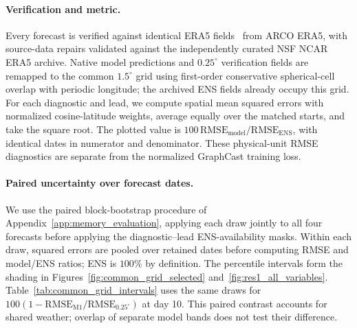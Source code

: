 \documentclass{article}
\newcommand{\vfourchange}[1]{{\color{blue}#1}}
\newif\ifvfivechanges
\begin{document}
\paragraph{\vfourchange{Verification and metric.}}
\vfourchange{Every forecast is verified against identical ERA5 fields~\citep{hersbach2020era5} from ARCO ERA5, with source-data repairs validated against the independently curated NSF NCAR ERA5 archive. Native model predictions and $0.25^\circ$ verification fields are remapped to the common $1.5^\circ$ grid using first-order conservative spherical-cell overlap with periodic longitude; the archived ENS fields already occupy this grid. For each diagnostic and lead, we compute spatial mean squared errors with normalized cosine-latitude weights, average equally over the matched starts, and take the square root. The plotted value is $100\,\mathrm{RMSE}_{\mathrm{model}}/\mathrm{RMSE}_{\mathrm{ENS}}$, with identical dates in numerator and denominator. These physical-unit RMSE diagnostics are separate from the normalized GraphCast training loss.}

\paragraph{\vfourchange{Paired uncertainty over forecast dates.}}
\ifvfivechanges
\par\begingroup\color{vfiveDeleted}\noindent
\sout{We use 10,000 non-wrapping moving-block-bootstrap draws with seed 20260916 and blocks of five consecutive positions on the original regular 122-date grid (12 elapsed days). A draw concatenates sampled blocks and truncates to 122 positions. The same draw is applied jointly to all four forecasts, and each diagnostic--lead ENS-availability mask is applied after resampling. For each draw we pool spatial MSE over the retained sampled dates, take square roots, and compute model/ENS RMSE ratios. Shading in Figures~\mbox{\ref{fig:common_grid_selected}} and~\mbox{\ref{fig:res1_all_variables}} shows the 2.5th and 97.5th percentiles. ENS is exactly $100\%$ by definition. Table~\mbox{\ref{tab:common_grid_intervals}} instead reports paired intervals for $100(1-\mathrm{RMSE}_{\mathrm{M1}}/\mathrm{RMSE}_{0.25^\circ})$ at day 10, using the same draws. Pairing accounts for shared weather variability; overlap of separate model bands is not a test of their difference.}
\par\endgroup
\fi
\vfourchange{We use the paired block-bootstrap procedure of Appendix~\ref{app:memory_evaluation}, applying each draw jointly to all four forecasts before applying the diagnostic--lead ENS-availability masks. Within each draw, squared errors are pooled over retained dates before computing RMSE and model/ENS ratios; ENS is $100\%$ by definition. The percentile intervals form the shading in Figures~\ref{fig:common_grid_selected} and~\ref{fig:res1_all_variables}. Table~\ref{tab:common_grid_intervals} uses the same draws for $100(1-\mathrm{RMSE}_{\mathrm{M1}}/\mathrm{RMSE}_{0.25^\circ})$ at day 10. This paired contrast accounts for shared weather; overlap of separate model bands does not test their difference.}
\end{document}
